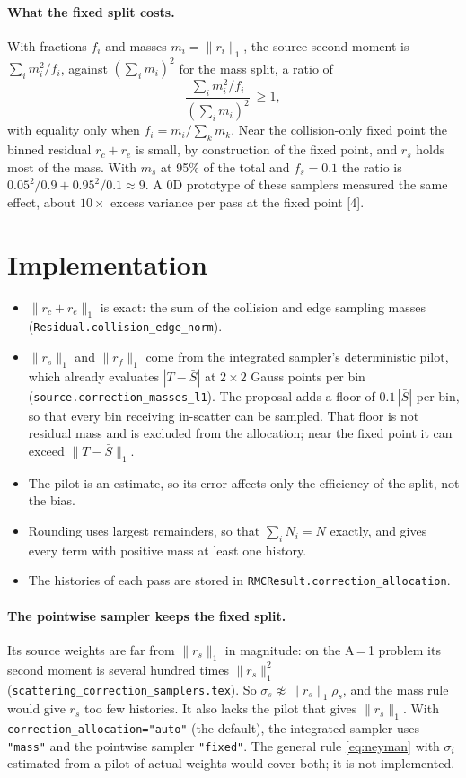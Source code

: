 \documentclass[11pt]{article}
\newcommand{\Sbar}{\bar S}
\begin{document}
\paragraph{What the fixed split costs.} With fractions $f_i$ and masses $m_i =
\|r_i\|_1$, the source second moment is $\sum_i m_i^2/f_i$, against
$(\sum_i m_i)^2$ for the mass split, a ratio of
\begin{equation}
  \frac{\sum_i m_i^2/f_i}{(\sum_i m_i)^2}\ \ge 1 ,
\end{equation}
with equality only when $f_i = m_i/\sum_k m_k$. Near the collision-only fixed point the
binned residual $r_c + r_e$ is small, by construction of the fixed point, and $r_s$
holds most of the mass. With $m_s$ at 95\% of the total and $f_s = 0.1$ the ratio is
$0.05^2/0.9 + 0.95^2/0.1 \approx 9$. A 0D prototype of these samplers measured the same
effect, about $10\times$ excess variance per pass at the fixed point [4].

\section{Implementation}

\begin{itemize}
  \item $\|r_c + r_e\|_1$ is exact: the sum of the collision and edge sampling masses
  (\texttt{Residual.collision\_edge\_norm}).
  \item $\|r_s\|_1$ and $\|r_f\|_1$ come from the integrated sampler's deterministic
  pilot, which already evaluates $|T - \Sbar|$ at $2\times2$ Gauss points per bin
  (\texttt{source.correction\_masses\_l1}). The proposal adds a floor of
  $0.1\,|\Sbar|$ per bin, so that every bin receiving in-scatter can be sampled. That
  floor is not residual mass and is excluded from the allocation; near the fixed point
  it can exceed $\|T-\Sbar\|_1$.
  \item The pilot is an estimate, so its error affects only the efficiency of the
  split, not the bias.
  \item Rounding uses largest remainders, so that $\sum_iN_i=N$ exactly, and gives
  every term with positive mass at least one history.
  \item The histories of each pass are stored in \texttt{RMCResult.correction\_allocation}.
\end{itemize}

\paragraph{The pointwise sampler keeps the fixed split.} Its source weights are far
from $\|r_s\|_1$ in magnitude: on the A\,=\,1 problem its second moment is several
hundred times $\|r_s\|_1^2$ (\texttt{scattering\_correction\_samplers.tex}). So
$\sigma_s\not\approx\|r_s\|_1\rho_s$, and the mass rule would give $r_s$ too few
histories. It also lacks the pilot that gives $\|r_s\|_1$. With
\texttt{correction\_allocation="auto"} (the default), the integrated sampler uses
\texttt{"mass"} and the pointwise sampler \texttt{"fixed"}. The general rule
\eqref{eq:neyman} with $\sigma_i$ estimated from a pilot of actual weights would
cover both; it is not implemented.
\end{document}
